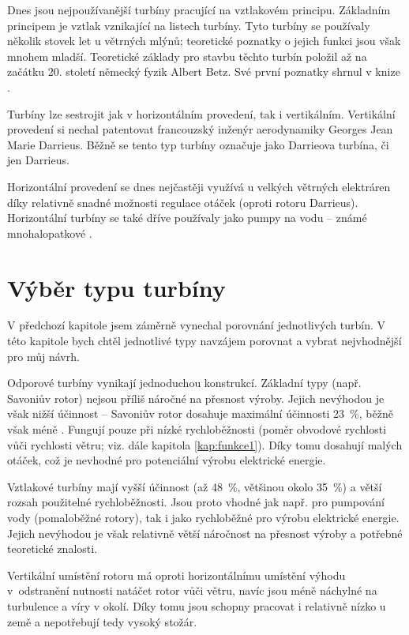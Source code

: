 		Dnes jsou nejpoužívanější turbíny pracující na vztlakovém principu. Základním principem je vztlak vznikající na listech turbíny. Tyto turbíny se používaly několik stovek let u větrných mlýnů; teoretické poznatky o jejich funkci jsou však mnohem mladší. Teoretické základy pro stavbu těchto turbín položil až na začátku 20. století německý fyzik Albert Betz\cite{betz}. Své první poznatky shrnul v knize  \cite{betz}.
		
		Turbíny lze sestrojit jak v horizontálním provedení, tak i vertikálním. Vertikální provedení si nechal patentovat francouzský inženýr aerodynamiky Georges Jean Marie Darrieus\cite{dar}. Běžně se tento typ turbíny označuje jako Darrieova turbína, či jen Darrieus.
		
		Horizontální provedení se dnes nejčastěji využívá u velkých větrných elektráren díky relativně snadné možnosti regulace otáček (oproti rotoru Darrieus). Horizontální turbíny se také dříve používaly jako pumpy na vodu – známé mnohalopatkové \cite{ve:ve}.
	\section{Výběr typu turbíny}
		V předchozí kapitole jsem záměrně vynechal porovnání jednotlivých turbín. V této kapitole bych chtěl jednotlivé typy navzájem porovnat a vybrat nejvhodnější pro můj návrh.
		
		Odporové turbíny vynikají jednoduchou konstrukcí. Základní typy (např. Savoniův rotor) nejsou příliš náročné na přesnost výroby. Jejich nevýhodou je však nižší účinnost – Savoniův rotor dosahuje maximální účinnosti 23~\%, běžně však méně \cite{Rychetnik:Motory}. Fungují pouze při nízké rychloběžnosti (poměr obvodové rychlosti vůči rychlosti větru; viz. dále kapitola \ref{kap:funkce1}). Díky tomu dosahují malých otáček, což je nevhodné pro potenciální výrobu elektrické energie.
		
		Vztlakové turbíny mají vyšší účinnost (až 48~\%, většinou okolo 35~\%) \cite{Rychetnik:Motory} a větší rozsah použitelné rychloběžnosti. Jsou proto vhodné jak např. pro pumpování vody (pomaloběžné rotory), tak i jako rychloběžné pro výrobu elektrické energie. Jejich nevýhodou je však relativně větší náročnost na přesnost výroby a potřebné teoretické znalosti.
		
		Vertikální umístění rotoru má oproti horizontálnímu umístění výhodu v~odstranění nutnosti natáčet rotor vůči větru, navíc jsou méně náchylné na turbulence a víry v okolí. Díky tomu jsou schopny pracovat i relativně nízko u země a nepotřebují tedy vysoký stožár\cite{Rychetnik:Motory}\cite{ve:ve}.
		

